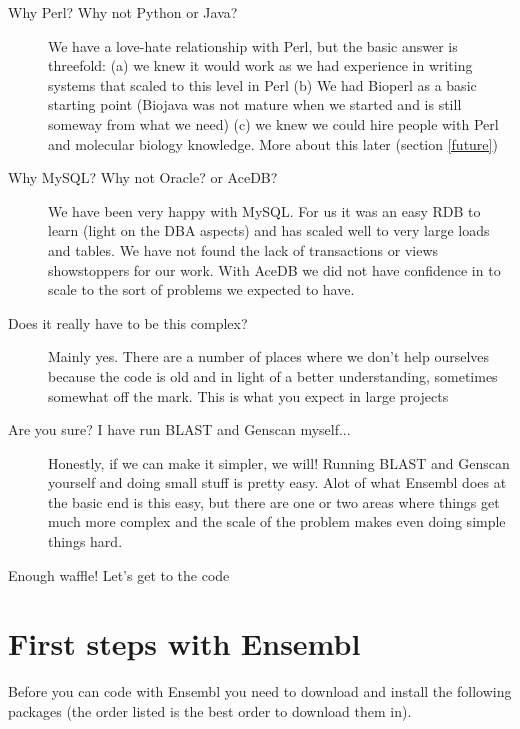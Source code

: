 \documentclass[11pt,a4paper]{article}
\begin{document}
\begin{description}
\item[Why Perl? Why not Python or Java?] We have a love-hate relationship
with Perl, but the basic answer is threefold: (a) we knew it would work
as we had experience in writing systems that scaled to this level in Perl
(b) We had Bioperl as a basic starting point (Biojava was not mature when we
started and is still someway from what we need) (c) we knew we could hire people
with Perl and molecular biology knowledge. More about this later (section \ref{future})
\item[Why MySQL? Why not Oracle? or AceDB?] We have been very happy with MySQL.
For us it was an easy RDB to learn (light on the DBA aspects) and has scaled well
to very large loads and tables. We have not found the lack of transactions or views
showstoppers for our work. With AceDB we did not have confidence in to scale to the
sort of problems we expected to have.
\item[Does it really have to be this complex?] Mainly yes. There are a number of places
where we don't help ourselves because the code is old and in light of a better
understanding, sometimes somewhat off the mark. This is what you expect in large
projects
\item[Are you sure? I have run BLAST and Genscan myself...] Honestly, if we can make it
simpler, we will! Running BLAST and Genscan yourself and doing small
stuff is pretty easy. Alot of what Ensembl does at the basic end is
this easy, but there are one or two areas where things get much more complex and
the scale of the problem makes even doing simple things hard.
\end{description}

Enough waffle! Let's get to the code

\section{First steps with Ensembl}

Before you can code with Ensembl you need to download and install the
following packages (the order listed is the best order to download them in).
\end{document}
